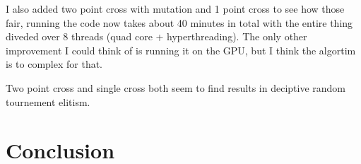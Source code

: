 \documentclass{article}
\begin{document}
\begin{empfile}
I also added two point cross with mutation and 1 point cross to see how 
those fair, running the code now takes about 40 minutes in total with the
entire thing diveded over 8 threads (quad core + hyperthreading). The only
other improvement I could think of is running it on the GPU, but I think
the algortim is to complex for that.

Two point cross and single cross both seem to find results in deciptive 
random tournement elitism.

\newpage


\section{Conclusion}
\end{empfile}
\end{document}
